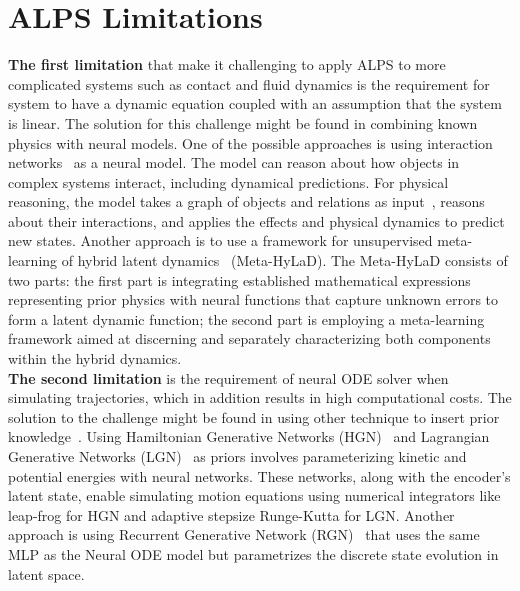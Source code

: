 \documentclass[acmtog]{techreportacmart}
\begin{document}
\section{ALPS Limitations}
\textbf{The first limitation} that make it challenging to apply ALPS to more complicated systems such as contact and fluid dynamics is the requirement for system to have a dynamic equation coupled with an assumption that the system is linear. The solution for this challenge might be found in combining known physics with neural models. One of the possible approaches is using interaction networks~\cite{battaglia2016interaction} as a neural model. The model can reason about how objects in complex systems interact, including dynamical predictions. For physical reasoning, the model takes a graph of objects and relations as input~\cite{scarselli2009graph}, reasons about their interactions, and applies the effects and physical dynamics to predict new states. Another approach is to use a framework for unsupervised meta-learning of hybrid latent dynamics~\cite{ye2024unsupervised} (Meta-HyLaD). The Meta-HyLaD consists of two parts: the first part is integrating established mathematical expressions representing prior physics with neural functions that capture unknown errors to form a latent dynamic function; the second part is employing a meta-learning framework aimed at discerning and separately characterizing both components within the hybrid dynamics.
\\
\textbf{The second limitation} is the requirement of neural ODE solver when simulating trajectories, which in addition results in high computational costs. The solution to the challenge might be found in using other technique to insert prior knowledge~\cite{botev2021which}. Using Hamiltonian Generative Networks (HGN)~\cite{toth2019hamiltonian} and Lagrangian Generative Networks (LGN)~\cite{lutter2019deep} as priors involves parameterizing kinetic and potential energies with neural networks. These networks, along with the encoder's latent state, enable simulating motion equations using numerical integrators like leap-frog for HGN and adaptive stepsize Runge-Kutta for LGN. Another approach is using Recurrent Generative Network (RGN)~\cite{chen2019symplectic} that uses the same MLP as the Neural ODE model but parametrizes the discrete state evolution in latent space. 
\end{document}
